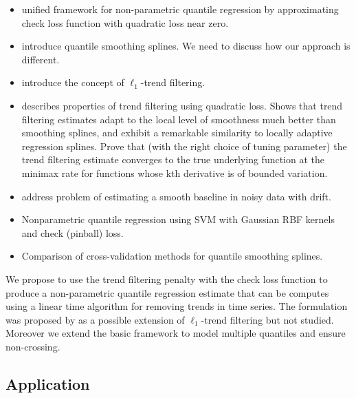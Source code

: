 \documentclass[12pt]{article}
\numberwithin{equation}{section}
\theoremstyle{plain}
\begin{document}
\begin{itemize}
	\item \cite{Oh2011} unified framework for non-parametric quantile regression by approximating check loss function with quadratic loss near zero.
	\item \cite{KoenkerNgPortnoy1994} introduce quantile smoothing splines. We need to discuss how our approach is different.
	\item \cite{Kim2009} introduce the concept of $\ell_1$-trend filtering.
	\item \cite{Tib2014} describes properties of trend filtering using quadratic loss. Shows that trend filtering estimates adapt to the local level of smoothness much better than smoothing splines, and exhibit a remarkable similarity to locally adaptive regression splines. Prove that (with the right choice of tuning parameter) the trend filtering estimate
	converges to the true underlying function at the minimax rate for functions whose kth derivative is of bounded variation.
	\item \cite{Ning2014} address problem of estimating a smooth baseline in noisy data with drift.
	\item \cite{Takeuchi2006nonparametric} Nonparametric quantile regression using SVM with Gaussian RBF kernels and check (pinball) loss. 
	\item \cite{yuan2006gacv} Comparison of cross-validation methods for quantile smoothing splines.  
\end{itemize}
We propose to use the trend filtering penalty with the check loss function to produce a non-parametric quantile regression estimate that can be computes using a linear time algorithm for removing trends in time series. The formulation was proposed by \cite{Kim2009} as a possible extension of $\ell_1$-trend filtering but not studied. Moreover we extend the basic framework to model multiple quantiles and ensure non-crossing. 

\subsection{Application}
\end{document}
